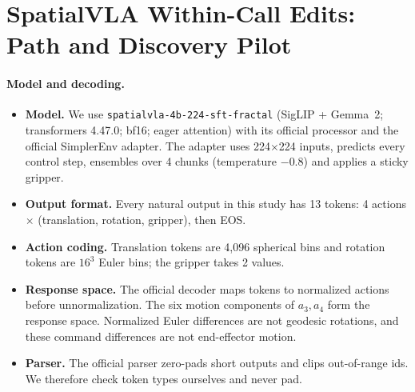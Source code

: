 \section{SpatialVLA Within-Call Edits: Path and Discovery Pilot}
\label{sec:svla}
\paragraph{Model and decoding.}
\begin{itemize}
\item \textbf{Model.} We use \texttt{spatialvla-4b-224-sft-fractal} (SigLIP + Gemma~2; transformers 4.47.0; bf16; eager attention) with its official processor and the official SimplerEnv adapter. The adapter uses 224$\times$224 inputs, predicts every control step, ensembles over 4 chunks (temperature $-0.8$) and applies a sticky gripper.
\item \textbf{Output format.} Every natural output in this study has 13 tokens: 4 actions $\times$ (translation, rotation, gripper), then EOS.
\item \textbf{Action coding.} Translation tokens are 4,096 spherical bins and rotation tokens are $16^3$ Euler bins; the gripper takes 2 values.
\item \textbf{Response space.} The official decoder maps tokens to normalized actions before unnormalization. The six motion components of $a_3,a_4$ form the response space. Normalized Euler differences are not geodesic rotations, and these command differences are not end-effector motion.
\item \textbf{Parser.} The official parser zero-pads short outputs and clips out-of-range ids. We therefore check token types ourselves and never pad.
\end{itemize}

